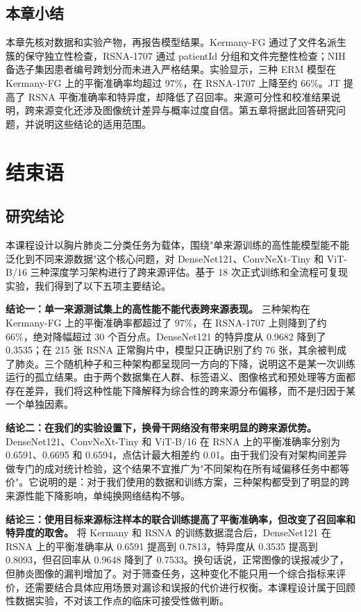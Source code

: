 \documentclass[12pt,a4paper,UTF8,openany]{ctexbook}
\begin{document}
\section{本章小结}

本章先核对数据和实验产物，再报告模型结果。Kermany-FG 通过了文件名派生簇的保守独立性检查，RSNA-1707 通过 patientId 分组和文件完整性检查；NIH 备选子集因患者编号跨划分而未进入严格结果。实验显示，三种 ERM 模型在 Kermany-FG 上的平衡准确率均超过 97\%，在 RSNA-1707 上降至约 66\%。JT 提高了 RSNA 平衡准确率和特异度，却降低了召回率。来源可分性和校准结果说明，跨来源变化还涉及图像统计差异与概率过度自信。第五章将据此回答研究问题，并说明这些结论的适用范围。

\chapter{结束语}

\section{研究结论}

本课程设计以胸片肺炎二分类任务为载体，围绕"单来源训练的高性能模型能不能泛化到不同来源数据"这个核心问题，对 DenseNet121、ConvNeXt-Tiny 和 ViT-B/16 三种深度学习架构进行了跨来源评估。基于 18 次正式训练和全流程可复现实验，我们得到了以下五项主要结论。

\textbf{结论一：单一来源测试集上的高性能不能代表跨来源表现。} 三种架构在 Kermany-FG 上的平衡准确率都超过了 97\%，在 RSNA-1707 上则降到了约 66\%，绝对降幅超过 30 个百分点。DenseNet121 的特异度从 0.9682 降到了 0.3535；在 215 张 RSNA 正常胸片中，模型只正确识别了约 76 张，其余被判成了肺炎。三个随机种子和三种架构都呈现同一方向的下降，说明这不是某一次训练运行的孤立结果。由于两个数据集在人群、标签语义、图像格式和预处理等方面都存在差异，我们将这种性能下降解释为综合性的跨来源分布偏移，而不是归因于某一个单独因素。

\textbf{结论二：在我们的实验设置下，换骨干网络没有带来明显的跨来源优势。} DenseNet121、ConvNeXt-Tiny 和 ViT-B/16 在 RSNA 上的平衡准确率分别为 0.6591、0.6695 和 0.6594，点估计最大相差约 0.01。由于我们没有对架构间差异做专门的成对统计检验，这个结果不宜推广为"不同架构在所有域偏移任务中都等价"。它说明的是：对于我们使用的数据和训练方案，三种架构都受到了明显的跨来源性能下降影响，单纯换网络结构不够。

\textbf{结论三：使用目标来源标注样本的联合训练提高了平衡准确率，但改变了召回率和特异度的取舍。} 将 Kermany 和 RSNA 的训练数据混合后，DenseNet121 在 RSNA 上的平衡准确率从 0.6591 提高到 0.7813，特异度从 0.3535 提高到 0.8093，但召回率从 0.9648 降到了 0.7533。换句话说，正常图像的误报减少了，但肺炎图像的漏判增加了。对于筛查任务，这种变化不能只用一个综合指标来评价，还需要结合具体应用场景对漏诊和误报的代价进行权衡。本课程设计属于回顾性数据实验，不对该工作点的临床可接受性做判断。
\end{document}
